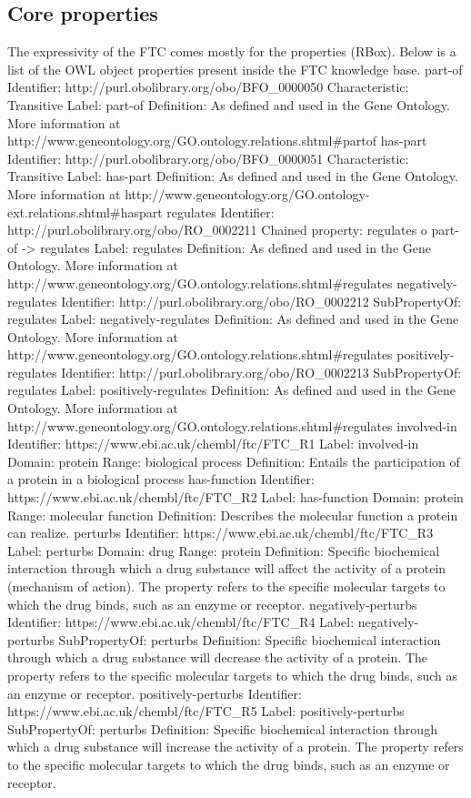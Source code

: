 \documentclass{bioinfo}
\begin{document}
\subsection{Core properties}
The expressivity of the FTC comes mostly for the properties (RBox). Below is a list of the 
OWL object properties present inside the FTC knowledge base.
part-of
Identifier: http://purl.obolibrary.org/obo/BFO_0000050
Characteristic: Transitive
Label: part-of
Definition: As defined and used in the Gene Ontology. More information at http://www.geneontology.org/GO.ontology.relations.shtml#partof
has-part
Identifier: http://purl.obolibrary.org/obo/BFO_0000051
Characteristic: Transitive
Label: has-part
Definition: As defined and used in the Gene Ontology. More information at http://www.geneontology.org/GO.ontology-ext.relations.shtml#haspart
regulates
Identifier: http://purl.obolibrary.org/obo/RO_0002211
Chained property: regulates o part-of -> regulates
Label: regulates
Definition: As defined and used in the Gene Ontology. More information at http://www.geneontology.org/GO.ontology.relations.shtml#regulates
negatively-regulates
Identifier: http://purl.obolibrary.org/obo/RO_0002212
SubPropertyOf: regulates
Label: negatively-regulates
Definition: As defined and used in the Gene Ontology. More information at http://www.geneontology.org/GO.ontology.relations.shtml#regulates
positively-regulates
Identifier: http://purl.obolibrary.org/obo/RO_0002213
SubPropertyOf: regulates
Label: positively-regulates
Definition: As defined and used in the Gene Ontology. More information at http://www.geneontology.org/GO.ontology.relations.shtml#regulates
involved-in
Identifier: https://www.ebi.ac.uk/chembl/ftc/FTC_R1
Label: involved-in
Domain: protein
Range: biological process
Definition: Entails the participation of a protein in a biological process
has-function
Identifier: https://www.ebi.ac.uk/chembl/ftc/FTC_R2
Label: has-function
Domain: protein
Range: molecular function
Definition: Describes the molecular function a protein can realize.
perturbs
Identifier: https://www.ebi.ac.uk/chembl/ftc/FTC_R3
Label: perturbs
Domain: drug
Range: protein
Definition: Specific biochemical interaction through which a drug substance 
will affect the activity of a protein (mechanism of action). The property refers to the specific molecular 
targets to which the drug binds, such as an enzyme or receptor.
negatively-perturbs
Identifier: https://www.ebi.ac.uk/chembl/ftc/FTC_R4
Label: negatively-perturbs
SubPropertyOf: perturbs
Definition: Specific biochemical interaction through which a drug substance will decrease the activity of a protein. 
The property refers to the specific molecular targets to which the drug binds, such as an enzyme or receptor.
positively-perturbs
Identifier: https://www.ebi.ac.uk/chembl/ftc/FTC_R5
Label: positively-perturbs
SubPropertyOf: perturbs
Definition: Specific biochemical interaction through which a drug substance will increase the activity of a protein. 
The property refers to the specific molecular targets to which the drug binds, such as an enzyme or receptor.
\end{document}
